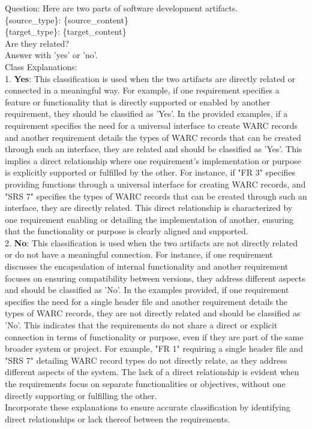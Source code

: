 Question: Here are two parts of software development artifacts.\\

\{source\_type\}: \tripplequote\{source\_content\}\tripplequote\\

\{target\_type\}: \tripplequote\{target\_content\}\tripplequote\\
Are they related?\\

Answer with 'yes' or 'no'.\\

Class Explanations:\\

1. \textbf{Yes}: This classification is used when the two artifacts are directly related or connected in a meaningful way. For example, if one requirement specifies a feature or functionality that is directly supported or enabled by another requirement, they should be classified as 'Yes'. In the provided examples, if a requirement specifies the need for a universal interface to create WARC records and another requirement details the types of WARC records that can be created through such an interface, they are related and should be classified as 'Yes'. This implies a direct relationship where one requirement's implementation or purpose is explicitly supported or fulfilled by the other. For instance, if "FR 3" specifies providing functions through a universal interface for creating WARC records, and "SRS 7" specifies the types of WARC records that can be created through such an interface, they are directly related. This direct relationship is characterized by one requirement enabling or detailing the implementation of another, ensuring that the functionality or purpose is clearly aligned and supported.\\

2. \textbf{No}: This classification is used when the two artifacts are not directly related or do not have a meaningful connection. For instance, if one requirement discusses the encapsulation of internal functionality and another requirement focuses on ensuring compatibility between versions, they address different aspects and should be classified as 'No'. In the examples provided, if one requirement specifies the need for a single header file and another requirement details the types of WARC records, they are not directly related and should be classified as 'No'. This indicates that the requirements do not share a direct or explicit connection in terms of functionality or purpose, even if they are part of the same broader system or project. For example, "FR 1" requiring a single header file and "SRS 7" detailing WARC record types do not directly relate, as they address different aspects of the system. The lack of a direct relationship is evident when the requirements focus on separate functionalities or objectives, without one directly supporting or fulfilling the other.\\

Incorporate these explanations to ensure accurate classification by identifying direct relationships or lack thereof between the requirements.
